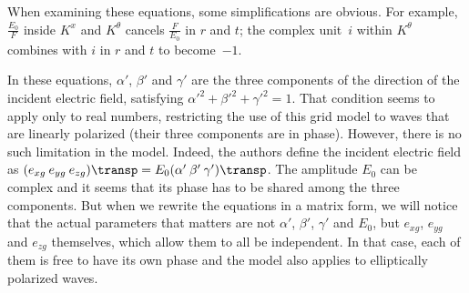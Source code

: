 When examining these equations, some simplifications are obvious.
For example, $\frac{E_0}{F}$ inside $K^x$ and $K^\theta$ cancels $\frac{F}{E_0}$ in $r$ and $t$;
the complex unit~$i$ within $K^\theta$ combines with $i$ in $r$ and $t$ to become~$-1$.

In these equations, $\alpha'$, $\beta'$ and $\gamma'$ are the three components of the direction of the incident electric field, satisfying $\alpha'^2 + \beta'^2 + \gamma'^2 = 1$.
That condition seems to apply only to real numbers, restricting the use of this grid model to waves that are linearly polarized (their three components are in phase).
However, there is no such limitation in the model.
Indeed, the authors define the incident electric field as
$(e_{xg} \: e_{yg} \: e_{zg})\transp = E_0(\alpha' \: \beta' \: \gamma')\transp$.
The amplitude $E_0$ can be complex and it seems that its phase has to be shared among the three components.
But when we rewrite the equations in a matrix form, we will notice that the actual parameters that matters are not $\alpha'$, $\beta'$, $\gamma'$ and $E_0$, but $e_{xg}$, $e_{yg}$ and $e_{zg}$ themselves, which allow them to all be independent.
In that case, each of them is free to have its own phase and the model also applies to elliptically polarized waves.

